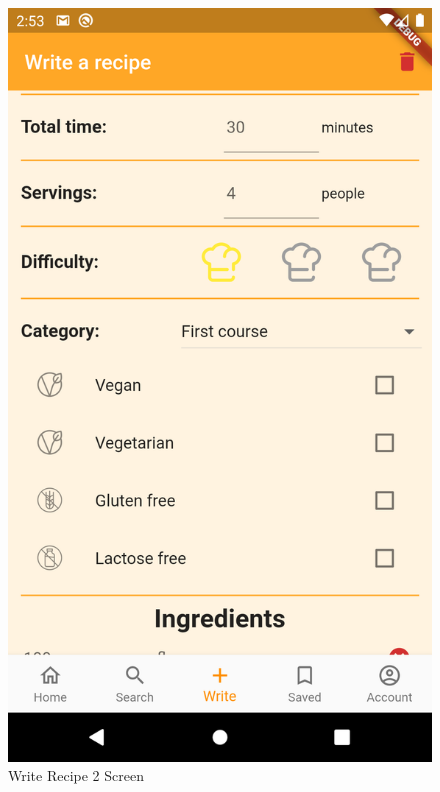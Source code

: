 \begin{figure}[H]
\begin{minipage}{0.31\textwidth}
		\includegraphics[width = .9\linewidth]{img/Write_2.png}
		\caption{Write Recipe 2 Screen}
	\end{minipage}\hfill
	\begin{minipage}{0.31\textwidth}
		\centering

\end{minipage}
\end{figure}
